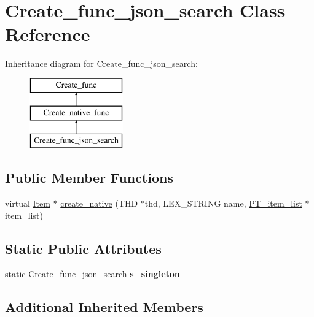 \hypertarget{classCreate__func__json__search}{}\section{Create\+\_\+func\+\_\+json\+\_\+search Class Reference}
\label{classCreate__func__json__search}
Inheritance diagram for Create\+\_\+func\+\_\+json\+\_\+search\+:\begin{figure}[H]
\begin{center}
\leavevmode
\includegraphics[height=3.000000cm]{classCreate__func__json__search}
\end{center}
\end{figure}
\subsection*{Public Member Functions}
\begin{DoxyCompactItemize}
\item 
virtual \mbox{\hyperlink{classItem}{Item}} $\ast$ \mbox{\hyperlink{classCreate__func__json__search_a0c112f98731df77db850281e684a7370}{create\+\_\+native}} (T\+HD $\ast$thd, L\+E\+X\+\_\+\+S\+T\+R\+I\+NG name, \mbox{\hyperlink{classPT__item__list}{P\+T\+\_\+item\+\_\+list}} $\ast$item\+\_\+list)
\end{DoxyCompactItemize}
\subsection*{Static Public Attributes}
\begin{DoxyCompactItemize}
\item 
\mbox{\label{classCreate__func__json__search_a64006b8c209614c23df082936e9728fb}} 
static \mbox{\hyperlink{classCreate__func__json__search}{Create\+\_\+func\+\_\+json\+\_\+search}} {\bfseries s\+\_\+singleton}
\end{DoxyCompactItemize}
\subsection*{Additional Inherited Members}


